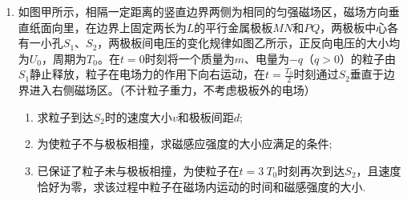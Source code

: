 \begin{enumerate}[leftmargin=0em]
\newpage
\item
{}
如图甲所示，相隔一定距离的竖直边界两侧为相同的匀强磁场区，磁场方向垂直纸面向里，在边界上固定两长为$ L $的平行金属极板$ MN $和$ PQ $，两极板中心各有一小孔$ S_{1} $、$ S_{2} $，两极板间电压的变化规律如图乙所示，正反向电压的大小均为$ U_{0} $，周期为$ T_{0} $。在$ t=0 $时刻将一个质量为$ m $、电量为$ -q $（$ q>0 $）的粒子由$ S_{1} $静止释放，粒子在电场力的作用下向右运动，在$t = \frac { T _ { 0 } } { 2 }$时刻通过$ S_{2} $垂直于边界进入右侧磁场区。（不计粒子重力，不考虑极板外的电场）
\begin{enumerate}
\renewcommand{\labelenumi}{\arabic{enumi}.}
\item
求粒子到达$ S_{2} $时的速度大小$ v $和极板间距$ d $;
\item 
为使粒子不与极板相撞，求磁感应强度的大小应满足的条件;
\item 
已保证了粒子未与极板相撞，为使粒子在$ t=3 \ T_0 $时刻再次到达$ S_{2} $，且速度恰好为零，求该过程中粒子在磁场内运动的时间和磁感强度的大小.

\end{enumerate}
\begin{figure}[h!]
\flushright

\end{figure}







\end{enumerate}
